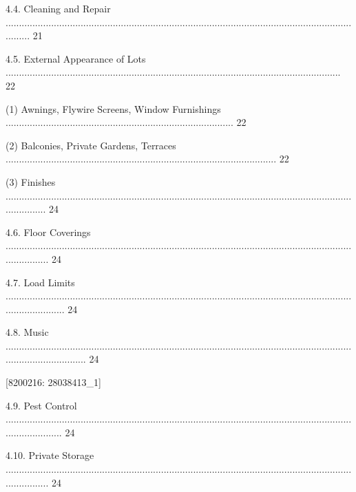 \documentclass{article}
\begin{document}
{\fontsize{9.99}{1}4.4. Cleaning and Repair .......................................................................................................................................... 21 }

{\fontsize{9.99}{1}4.5. External Appearance of Lots ............................................................................................................................. 22 }

{\fontsize{9.962}{1}(1) Awnings, Flywire Screens, Window Furnishings ..................................................................................... 22 }

{\fontsize{9.962}{1}(2) Balconies, Private Gardens, Terraces ..................................................................................................... 22 }

{\fontsize{9.962}{1}(3) Finishes ................................................................................................................................................ 24 }

{\fontsize{9.99}{1}4.6. Floor Coverings ................................................................................................................................................. 24 }

{\fontsize{9.99}{1}4.7. Load Limits ....................................................................................................................................................... 24 }

{\fontsize{9.99}{1}4.8. Music ............................................................................................................................................................... 24 }

\newpage
















{\fontsize{7.02}{1}[8200216: 28038413\_1] }

{\fontsize{9.99}{1}4.9. Pest Control ...................................................................................................................................................... 24 }

{\fontsize{9.99}{1}4.10. Private Storage ................................................................................................................................................. 24 }
\end{document}
